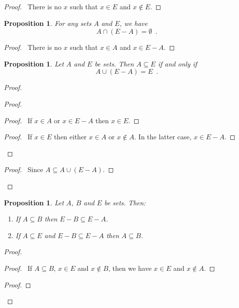 \documentclass{report}
\let\qed\relax
\newtheorem{prop}[ax]{Proposition}
\theoremstyle{definition}
\begin{document}
\begin{proof}
\pf\ There is no $x$ such that $x \in E$ and $x \notin E$. \qed
\end{proof}

\begin{prop}
For any sets $A$ and $E$, we have
\[ A \cap (E - A) = \emptyset \enspace . \]
\end{prop}

\begin{proof}
\pf\ There is no $x$ such that $x \in A$ and $x \in E - A$. \qed
\end{proof}

\begin{prop}
Let $A$ and $E$ be sets. Then $A \subseteq E$ if and only if
\[ A \cup (E - A) = E \enspace . \]
\end{prop}

\begin{proof}
\pf
{}
\begin{proof}
	\begin{proof}
		\pf\ If $x \in A$ or $x \in E - A$ then $x \in E$.
	\end{proof}
	\begin{proof}
		\pf\ If $x \in E$ then either $x \in A$ or $x \notin A$. In the latter case, $x \in E - A$.
	\end{proof}
\end{proof}
\begin{proof}
	\pf\ Since $A \subseteq A \cup (E - A)$.
\end{proof}
\qed
\end{proof}

\begin{prop}
Let $A$, $B$ and $E$ be sets. Then:
\begin{enumerate}
\item If $A \subseteq B$ then $E - B \subseteq E - A$.
\item If $A \subseteq E$ and $E - B \subseteq E - A$ then $A \subseteq B$.
\end{enumerate}
\end{prop}

\begin{proof}
\pf
{}
\begin{proof}
	\pf\ If $A \subseteq B$, $x \in E$ and $x \notin B$, then we have $x \in E$ and $x \notin A$.
\end{proof}
\begin{proof}
\end{proof}
\qed
\end{proof}
\end{document}
